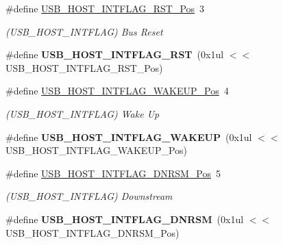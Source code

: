 \begin{DoxyCompactItemize}
\item 
\hypertarget{group___s_a_m_l21___u_s_b_ga256557b0b79be1c833d01d891833354c}{}\#define \hyperlink{group___s_a_m_l21___u_s_b_ga256557b0b79be1c833d01d891833354c}{U\+S\+B\+\_\+\+H\+O\+S\+T\+\_\+\+I\+N\+T\+F\+L\+A\+G\+\_\+\+R\+S\+T\+\_\+\+Pos}~3\label{group___s_a_m_l21___u_s_b_ga256557b0b79be1c833d01d891833354c}

\begin{DoxyCompactList}\small\item\em (U\+S\+B\+\_\+\+H\+O\+S\+T\+\_\+\+I\+N\+T\+F\+L\+A\+G) Bus Reset \end{DoxyCompactList}\item 
\hypertarget{group___s_a_m_l21___u_s_b_ga755fb028bde9e3cdf6e642b4d47f18de}{}\#define {\bfseries U\+S\+B\+\_\+\+H\+O\+S\+T\+\_\+\+I\+N\+T\+F\+L\+A\+G\+\_\+\+R\+S\+T}~(0x1ul $<$$<$ U\+S\+B\+\_\+\+H\+O\+S\+T\+\_\+\+I\+N\+T\+F\+L\+A\+G\+\_\+\+R\+S\+T\+\_\+\+Pos)\label{group___s_a_m_l21___u_s_b_ga755fb028bde9e3cdf6e642b4d47f18de}

\item 
\hypertarget{group___s_a_m_l21___u_s_b_ga6ebc1f3494f6fad4e601d84a0d956a44}{}\#define \hyperlink{group___s_a_m_l21___u_s_b_ga6ebc1f3494f6fad4e601d84a0d956a44}{U\+S\+B\+\_\+\+H\+O\+S\+T\+\_\+\+I\+N\+T\+F\+L\+A\+G\+\_\+\+W\+A\+K\+E\+U\+P\+\_\+\+Pos}~4\label{group___s_a_m_l21___u_s_b_ga6ebc1f3494f6fad4e601d84a0d956a44}

\begin{DoxyCompactList}\small\item\em (U\+S\+B\+\_\+\+H\+O\+S\+T\+\_\+\+I\+N\+T\+F\+L\+A\+G) Wake Up \end{DoxyCompactList}\item 
\hypertarget{group___s_a_m_l21___u_s_b_ga5d2df38ffcf0b2fdca79d0d68d7c4569}{}\#define {\bfseries U\+S\+B\+\_\+\+H\+O\+S\+T\+\_\+\+I\+N\+T\+F\+L\+A\+G\+\_\+\+W\+A\+K\+E\+U\+P}~(0x1ul $<$$<$ U\+S\+B\+\_\+\+H\+O\+S\+T\+\_\+\+I\+N\+T\+F\+L\+A\+G\+\_\+\+W\+A\+K\+E\+U\+P\+\_\+\+Pos)\label{group___s_a_m_l21___u_s_b_ga5d2df38ffcf0b2fdca79d0d68d7c4569}

\item 
\hypertarget{group___s_a_m_l21___u_s_b_ga038c091d0853930f01ccdb9556c2c52b}{}\#define \hyperlink{group___s_a_m_l21___u_s_b_ga038c091d0853930f01ccdb9556c2c52b}{U\+S\+B\+\_\+\+H\+O\+S\+T\+\_\+\+I\+N\+T\+F\+L\+A\+G\+\_\+\+D\+N\+R\+S\+M\+\_\+\+Pos}~5\label{group___s_a_m_l21___u_s_b_ga038c091d0853930f01ccdb9556c2c52b}

\begin{DoxyCompactList}\small\item\em (U\+S\+B\+\_\+\+H\+O\+S\+T\+\_\+\+I\+N\+T\+F\+L\+A\+G) Downstream \end{DoxyCompactList}\item 
\hypertarget{group___s_a_m_l21___u_s_b_ga94c81c68c0259d2e400354c9e2427a3c}{}\#define {\bfseries U\+S\+B\+\_\+\+H\+O\+S\+T\+\_\+\+I\+N\+T\+F\+L\+A\+G\+\_\+\+D\+N\+R\+S\+M}~(0x1ul $<$$<$ U\+S\+B\+\_\+\+H\+O\+S\+T\+\_\+\+I\+N\+T\+F\+L\+A\+G\+\_\+\+D\+N\+R\+S\+M\+\_\+\+Pos)\label{group___s_a_m_l21___u_s_b_ga94c81c68c0259d2e400354c9e2427a3c}


\end{DoxyCompactItemize}
